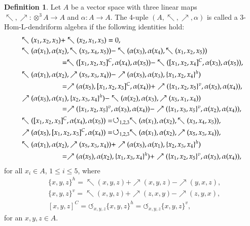 \documentclass[a4paper,11pt]{article}
\def\nw{\nwarrow}
\def\ne{\nearrow}
\theoremstyle{definition}
\newtheorem{defi}{Definition}[section]
\begin{document}
\begin{defi}
Let $A$ be a vector space with three linear maps $\nwarrow, \nearrow : \otimes^3 A \to A$ and $\alpha:A\rightarrow A$. The 4-uple $(A,\nwarrow,\nearrow,\alpha)$ is called a $3$-Hom-L-dendriform algebra if the following identities hold:
\begin{align}\label{3-Hom-L-dendriform0}
&  \nw(x_1,x_2,x_3)+ \nw(x_2,x_1,x_3)=0  ,\\
 \label{3-Hom-L-dendriform1}&   \nw(\alpha(x_1),\alpha(x_2),\nw(x_3,x_4,x_5))-  \nw(\alpha(x_3),\alpha(x_4),\nw(x_1,x_2,x_5)) \nonumber\\
&\hspace{2 cm} =\nw([x_1,x_2,x_3]^C,\alpha(x_4),\alpha(x_5))-\nw([x_1,x_2,x_4]^C,\alpha(x_3),\alpha(x_5))      ,\\
 &\label{3-Hom-L-dendriform2}  \nw(\alpha(x_1),\alpha(x_2),\ne(x_5,x_3,x_4))-\ne(\alpha(x_5),\alpha(x_3),\{x_1,x_2,x_4\}^h) \nonumber\\
& \hspace{2 cm} =\ne(\alpha(x_5),[x_1,x_2,x_3]^C,\alpha(x_4))+\ne(\{x_1,x_2,x_5\}^v,\alpha(x_3),\alpha(x_4))      , \\
 & \label{3-Hom-L-dendriform3}\ne(\alpha(x_5),\alpha(x_1),\{x_2,x_3,x_4\}^h)-\nw(\alpha(x_2),\alpha(x_3),\ne(x_5,x_1,x_4))
 \nonumber\\
&\hspace{2 cm}=\ne(\{x_1,x_2,x_5\}^v,\alpha(x_3),\alpha(x_4))-\ne(\{x_1,x_3,x_5\}^v,\alpha(x_2),\alpha(x_4))
      ,\\
 &  \label{3-Hom-L-dendriform4}\nw([x_1,x_2,x_3]^C,\alpha(x_4),\alpha(x_5))=\circlearrowleft_{1,2,3}\nw(\alpha(x_1),\alpha(x_2),\nw(x_3,x_4,x_5)),
   \\
 &   \label{3-Hom-L-dendriform5}     \ne(\alpha(x_5),[x_1,x_2,x_3]^C,\alpha(x_4))=\circlearrowleft_{1,2,3}\nw(\alpha(x_1),\alpha(x_2),\ne(x_5,x_3,x_4)) ,\\
 &   \label{3-Hom-L-dendriform6}   \nw(\alpha(x_1),\alpha(x_2),\ne(x_5,x_3,x_4))+\ne(\alpha(x_5),\alpha(x_1),\{x_2,x_3,x_4\}^h)\nonumber\\
&\hspace{2 cm} =\ne(\alpha(x_5),\alpha(x_2),\{x_1,x_3,x_4\}^h)+\ne(\{x_1,x_2,x_5\}^v,\alpha(x_3),\alpha(x_4))     ,
\end{align}
 for all $x_i \in A$, $1\leq i \leq 5$, where
\begin{align}
& \{x,y,z\}^h=\nw(x,y,z)+\ne(x,y,z)-\ne(y,x,z)  ,   \label{accolade horizintal}\\
& \{x,y,z\}^v=\nw(x,y,z)+\ne(z,x,y)-\ne(z,y,x)  ,   \label{accolade vertical}\\
& [x,y,z]^C= \circlearrowleft_{x,y,z} \{x,y,z\}^h=\circlearrowleft_{x,y,z} \{x,y,z\}^v, \label{crochet}
\end{align}
for an $x,y,z \in A$.
\end{defi}
\end{document}
